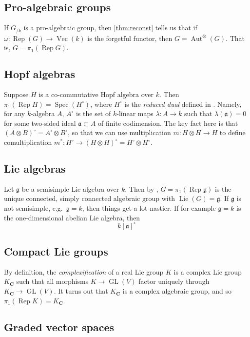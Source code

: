 \documentclass{article}
\DeclareMathOperator{\aut}{Aut}
\DeclareMathOperator{\GL}{GL}
\DeclareMathOperator{\lie}{Lie}
\DeclareMathOperator{\rep}{Rep}
\DeclareMathOperator{\spec}{Spec}
\DeclareMathOperator{\vect}{Vec}
\newcommand{\dC}{\mathbf{C}}
\newcommand{\fa}{\mathfrak{a}}
\newcommand{\fg}{\mathfrak{g}}
\begin{document}
\subsection{Pro-algebraic groups}

If $G_{/k}$ is a pro-algebraic group, then \autoref{thm:reconst} tells us that if 
$\omega:\rep(G)\to \vect(k)$ is the forgetful functor, then 
$G=\aut^\otimes(G)$. That is, $G=\pi_1(\rep G)$. 


\subsection{Hopf algebras}

Suppose $H$ is a co-commutative Hopf algebra over $k$. Then 
$\pi_1(\rep H)=\spec(H^\circ)$, where $H^\circ$ is the \emph{reduced dual} 
defined in \cite{cartier-2007}. Namely, for any $k$-algebra $A$, $A^\circ$ is 
the set of $k$-linear maps $\lambda:A\to k$ such that $\lambda(\fa)=0$ for some 
two-sided ideal $\fa\subset A$ of finite codimension. The key fact here is that 
$(A\otimes B)^\circ=A^\circ\otimes B^\circ$, so that we can use multiplication 
$m:H\otimes H\to H$ to define comultiplication 
$m^\ast:H^\circ\to (H\otimes H)^\circ=H^\circ\otimes H^\circ$. 


\subsection{Lie algebras}

Let $\fg$ be a semisimple Lie algebra over $k$. Then by \cite{milne-2007}, 
$G=\pi_1(\rep\fg)$ is the unique connected, simply connected algebraic group 
with $\lie(G)=\fg$. If $\fg$ is not semisimple, e.g.~$\fg=k$, then things get a 
lot nastier. If for example $\fg=k$ is the one-dimensional abelian Lie algebra, 
then 
\[
  k[\fa]^\circ
\]


\subsection{Compact Lie groups}

By definition, the \emph{complexification} of a real Lie group $K$ is a complex 
Lie group $K_\dC$ such that all morphisms $K\to \GL(V)$ factor uniquely through 
$K_\dC\to\GL(V)$. It turns out that $K_\dC$ is a complex algebraic group, and 
so $\pi_1(\rep K)=K_\dC$. 


\subsection{Graded vector spaces}
\end{document}

